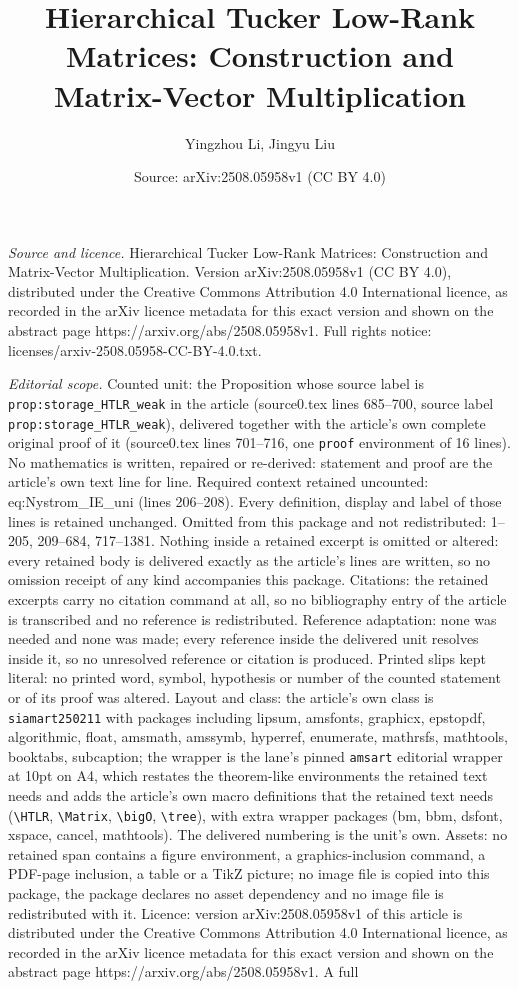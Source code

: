 \documentclass[10pt,a4paper]{amsart}
\title[Hierarchical Tucker Low-Rank Matrices: Construction and Matr]{Hierarchical Tucker Low-Rank Matrices: Construction and Matrix-Vector Multiplication}
\author{Yingzhou Li, Jingyu Liu}
\date{Source: arXiv:2508.05958v1 (CC BY 4.0)}
\begin{document}
\maketitle

\noindent\emph{Source and licence.} Hierarchical Tucker Low-Rank Matrices: Construction and Matrix-Vector Multiplication. Version arXiv:2508.05958v1 (CC BY 4.0), distributed under the Creative Commons Attribution 4.0 International licence, as recorded in the arXiv licence metadata for this exact version and shown on the abstract page https://arxiv.org/abs/2508.05958v1. Full rights notice: licenses/arxiv-2508.05958-CC-BY-4.0.txt.\par\smallskip

\noindent\textit{Editorial scope.} Counted unit: the Proposition whose source label is \texttt{prop:storage\_HTLR\_weak} in the article (source0.tex lines 685--700, source label \texttt{prop:storage\_HTLR\_weak}), delivered together with the article's own complete original proof of it (source0.tex lines 701--716, one \texttt{proof} environment of 16 lines). No mathematics is written, repaired or re-derived: statement and proof are the article's own text line for line. Required context retained uncounted: eq:Nystrom\_IE\_uni (lines 206--208). Every definition, display and label of those lines is retained unchanged. Omitted from this package and not redistributed: 1--205, 209--684, 717--1381. Nothing inside a retained excerpt is omitted or altered: every retained body is delivered exactly as the article's lines are written, so no omission receipt of any kind accompanies this package. Citations: the retained excerpts carry no citation command at all, so no bibliography entry of the article is transcribed and no reference is redistributed. Reference adaptation: none was needed and none was made; every reference inside the delivered unit resolves inside it, so no unresolved reference or citation is produced. Printed slips kept literal: no printed word, symbol, hypothesis or number of the counted statement or of its proof was altered. Layout and class: the article's own class is \texttt{siamart250211} with packages including lipsum, amsfonts, graphicx, epstopdf, algorithmic, float, amsmath, amssymb, hyperref, enumerate, mathrsfs, mathtools, booktabs, subcaption; the wrapper is the lane's pinned \texttt{amsart} editorial wrapper at 10pt on A4, which restates the theorem-like environments the retained text needs and adds the article's own macro definitions that the retained text needs (\texttt{\textbackslash HTLR}, \texttt{\textbackslash Matrix}, \texttt{\textbackslash bigO}, \texttt{\textbackslash tree}), with extra wrapper packages (bm, bbm, dsfont, xspace, cancel, mathtools). The delivered numbering is the unit's own. Assets: no retained span contains a figure environment, a graphics-inclusion command, a PDF-page inclusion, a table or a TikZ picture; no image file is copied into this package, the package declares no asset dependency and no image file is redistributed with it. Licence: version arXiv:2508.05958v1 of this article is distributed under the Creative Commons Attribution 4.0 International licence, as recorded in the arXiv licence metadata for this exact version and shown on the abstract page https://arxiv.org/abs/2508.05958v1. A full 
\end{document}
